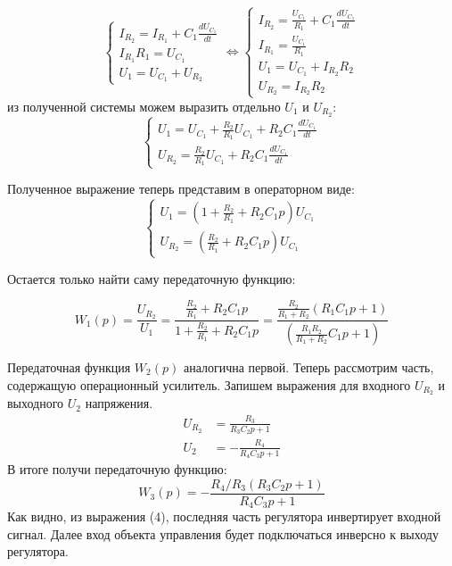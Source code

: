\documentclass[russian, utf8]{eskdtext}
\begin{document}
\begin{equation*}
    \begin{cases}
        I_{R_2} = I_{R_1} + C_1\frac{dU_{C_1}}{dt} \\
        I_{R_1}R_1 = U_{C_1} \\
        U_1 = U_{C_1} + U_{R_2}
    \end{cases}
    \Leftrightarrow
    \begin{cases}
        I_{R_2} = \frac{U_{C_1}}{R_1} + C_1\frac{dU_{C_1}}{dt} \\
        I_{R_1} = \frac{U_{C_1}}{R_1} \\
        U_1 = U_{C_1} + I_{R_2}R_2 \\
        U_{R_2} = I_{R_2}R_2
    \end{cases}
\end{equation*}
из полученной системы можем выразить отдельно $U_1$ и $U_{R_2}$:
\begin{equation*}
    \begin{cases}
        U_1 = U_{C_1} + \frac{R_2}{R_1}U_{C_1} + R_2C_1\frac{dU_{C_1}}{dt} \\
        U_{R_2} = \frac{R_2}{R_1}U_{C_1} + R_2C_1\frac{dU_{C_1}}{dt}
    \end{cases}
\end{equation*} \par
Полученное выражение теперь представим в операторном виде:
\begin{equation*}
    \begin{cases}
        U_1 = \left( 1 + \frac{R_2}{R_1} + R_2C_1p \right) U_{C_1} \\
        U_{R_2} = \left( \frac{R_2}{R_1} + R_2C_1p \right) U_{C_1}
    \end{cases}
\end{equation*} \par

Остается только найти саму передаточную функцию: \par
\begin{equation*}
    W_1(p) = \frac{U_{R_2}}{U_1} = \frac{\frac{R_2}{R_1} + R_2C_1p}{1 + \frac{R_2}{R_1} + R_2C_1p} = \frac{\frac{R_2}{R_1 + R_2}\left( R_1C_1p + 1 \right)}{\left( \frac{R_1R_2}{R_1 + R_2}C_1p + 1 \right)}
\end{equation*}

Передаточная функция $W_2(p)$ аналогична первой. Теперь рассмотрим часть, содержащую операционный усилитель. Запишем выражения для входного $U_{R_2}$ и выходного $U_2$ напряжения.
\begin{align*}
    U_{R_2} & = \frac{R_3}{R_3C_2 p + 1} \\
    U_2 & = -\frac{R_4}{R_4C_3 p + 1}
\end{align*}
В итоге получи передаточную функцию:
\begin{equation}
    W_3(p) = -\frac{R_4/R_3(R_3 C_2 p + 1)}{R_4C_3 p + 1}
\end{equation}
Как видно, из выражения (4), последняя часть регулятора инвертирует входной сигнал. Далее вход объекта управления будет подключаться инверсно к выходу регулятора.
\end{document}
